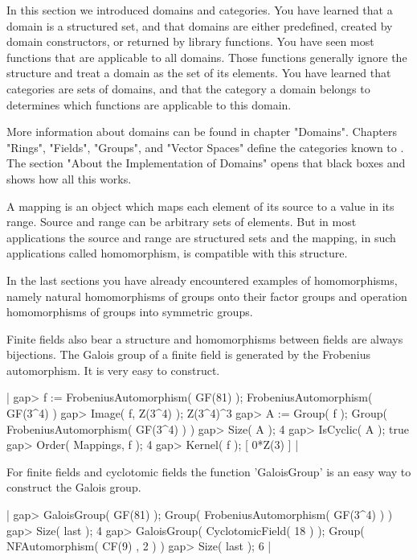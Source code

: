 In this section we  introduced domains and categories.  You have  learned
that  a  domain  is  a  structured  set,  and  that  domains  are  either
predefined,  created  by  domain  constructors,  or returned  by  library
functions.   You  have  seen  most  functions that are applicable  to all
domains.   Those functions generally  ignore  the structure  and  treat a
domain as the set of  its elements.  You have learned that categories are
sets of domains,  and that  the category a  domain belongs  to determines
which functions are applicable to this domain.

More  information  about domains  can  be  found  in  chapter  "Domains".
Chapters "Rings",  "Fields",  "Groups", and  "Vector  Spaces" define  the
categories known to {\GAP}.   The section  "About  the  Implementation of
Domains" opens that black boxes and shows how all this works.


A mapping is an  object which maps each element of its source to a  value
in its  range.  Source and  range can be arbitrary sets of elements.  But
in  most applications the source  and range are  structured sets  and the
mapping,  in  such applications  called homomorphism, is  compatible with
this structure.

In  the  last  sections  you  have   already  encountered   examples   of
homomorphisms, namely  natural homomorphisms of groups onto their  factor
groups and operation homomorphisms of groups into symmetric groups.

Finite fields also bear a structure and homomorphisms between  fields are
always  bijections.  The  Galois group of a finite field is  generated by
the Frobenius automorphism.  It is very easy to construct.

|    gap> f := FrobeniusAutomorphism( GF(81) );
    FrobeniusAutomorphism( GF(3^4) )
    gap> Image( f, Z(3^4) );
    Z(3^4)^3
    gap> A := Group( f );
    Group( FrobeniusAutomorphism( GF(3^4) ) )
    gap> Size( A );
    4
    gap> IsCyclic( A );
    true
    gap> Order( Mappings, f );
    4
    gap> Kernel( f );
    [ 0*Z(3) ] |

For  finite fields and cyclotomic fields the function 'GaloisGroup' is an
easy way to construct the Galois group.

|    gap> GaloisGroup( GF(81) );
    Group( FrobeniusAutomorphism( GF(3^4) ) )
    gap> Size( last );
    4
    gap> GaloisGroup( CyclotomicField( 18 ) );
    Group( NFAutomorphism( CF(9) , 2 ) )
    gap> Size( last );
    6 |

